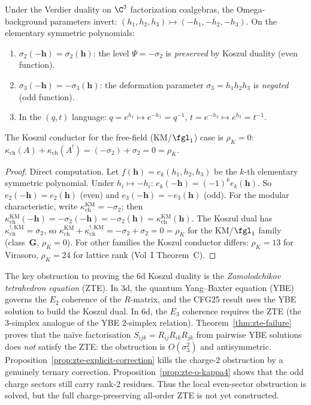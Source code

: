 \begin{proposition}
\label{prop:parameter-inversion-cfg25}
Under the Verdier duality on $\C^3$ factorization coalgebras, the Omega-background parameters invert: $(h_1, h_2, h_3) \mapsto (-h_1, -h_2, -h_3)$. On the elementary symmetric polynomials:
\begin{enumerate}[label=\textup{(\roman*)}]
 \item $\sigma_2(-\boldsymbol{h}) = \sigma_2(\boldsymbol{h})$: the level $\Psi = -\sigma_2$ is \emph{preserved} by Koszul duality (even function).
 \item $\sigma_3(-\boldsymbol{h}) = -\sigma_3(\boldsymbol{h})$: the deformation parameter $\sigma_3 = h_1 h_2 h_3$ is \emph{negated} (odd function).
 \item In the $(q, t)$ language: $q = e^{h_1} \mapsto e^{-h_1} = q^{-1}$, $t = e^{-h_2} \mapsto e^{h_2} = t^{-1}$.
\end{enumerate}
The Koszul conductor for the free-field (KM/$\fgl_1$) case is $\rho_K = 0$: $\kappa_{\mathrm{ch}}(A) + \kappa_{\mathrm{ch}}(A^!) = (-\sigma_2) + \sigma_2 = 0 = \rho_K$.
\end{proposition}

\begin{proof}
Direct computation. Let $f(\boldsymbol{h}) = e_k(h_1, h_2, h_3)$ be the $k$-th elementary symmetric polynomial. Under $h_i \mapsto -h_i$: $e_k(-\boldsymbol{h}) = (-1)^k e_k(\boldsymbol{h})$. So $e_2(-\boldsymbol{h}) = e_2(\boldsymbol{h})$ (even) and $e_3(-\boldsymbol{h}) = -e_3(\boldsymbol{h})$ (odd). For the modular characteristic, write $\kappa_{\mathrm{ch}}^{\mathrm{KM}} = -\sigma_2$; then $\kappa_{\mathrm{ch}}^{\mathrm{KM}}(-\boldsymbol{h}) = -\sigma_2(-\boldsymbol{h}) = -\sigma_2(\boldsymbol{h}) = \kappa_{\mathrm{ch}}^{\mathrm{KM}}(\boldsymbol{h})$. The Koszul dual has $\kappa_{\mathrm{ch}}^{!,\mathrm{KM}} = \sigma_2$, so $\kappa_{\mathrm{ch}}^{\mathrm{KM}} + \kappa_{\mathrm{ch}}^{!,\mathrm{KM}} = -\sigma_2 + \sigma_2 = 0 = \rho_K$ for the KM/$\fgl_1$ family (class~$\mathbf{G}$, $\rho_K = 0$). For other families the Koszul conductor differs: $\rho_K = 13$ for Virasoro, $\rho_K = 24$ for lattice rank (Vol~I Theorem~C).
\end{proof}

The key obstruction to proving the 6d Koszul duality is the \emph{Zamolodchikov tetrahedron equation} (ZTE). In 3d, the quantum Yang--Baxter equation (YBE) governs the $E_2$ coherence of the $R$-matrix, and the CFG25 result uses the YBE solution to build the Koszul dual. In 6d, the $E_3$ coherence requires the ZTE (the $3$-simplex analogue of the YBE $2$-simplex relation). Theorem~\ref{thm:zte-failure} proves that the na\"ive factorisation $S_{ijk} = R_{ij} R_{ik} R_{jk}$ from pairwise YBE solutions does \emph{not} satisfy the ZTE: the obstruction is $O(\sigma_3^2)$ and antisymmetric. Proposition~\ref{prop:zte-explicit-correction} kills the charge-$2$ obstruction by a genuinely ternary correction. Proposition~\ref{prop:zte-o-kappa4} shows that the odd charge sectors still carry rank-$2$ residues. Thus the local even-sector obstruction is solved, but the full charge-preserving all-order ZTE is not yet constructed.

